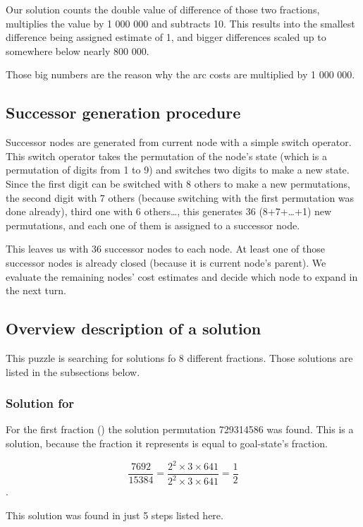 \documentclass{article}
\begin{document}
Our solution counts the double value of difference of those two fractions,
multiplies the value by 1 000 000 and subtracts 10. This results into the
smallest difference being assigned estimate of 1, and bigger differences scaled
up to somewhere below nearly 800 000.

Those big numbers are the reason why the arc costs are multiplied by 1 000 000.

\subsection{Successor generation procedure}

Successor nodes are generated from current node with a simple switch operator.
This switch operator takes the permutation of the node's state (which is a
permutation of digits from 1 to 9) and switches two digits to make a new state.
Since the first digit can be switched with 8 others to make a new permutations,
the second digit with 7 others (because switching with the first permutation
was done already), third one with 6 others\ldots, this generates 36
(8+7+\ldots+1) new permutations, and each one of them is assigned to a successor
node.

This leaves us with 36 successor nodes to each node. At least one of those
successor nodes is already closed (because it is current node's parent). We
evaluate the remaining nodes' cost estimates and decide which node to expand in
the next turn.

\subsection{Overview description of a solution}

This puzzle is searching for solutions fo 8 different fractions. Those solutions
are listed in the subsections below.

\subsubsection{Solution for }

For the first fraction () the solution permutation 729314586 was
found. This is a solution, because the fraction it represents is equal to
goal-state's fraction.

\[\frac{7692}{15384} = \frac{2^2 \times 3 \times 641}{2^2 \times 3 \times 641} =
\frac{1}{2}\].

This solution was found in just 5 steps listed here.
\end{document}

